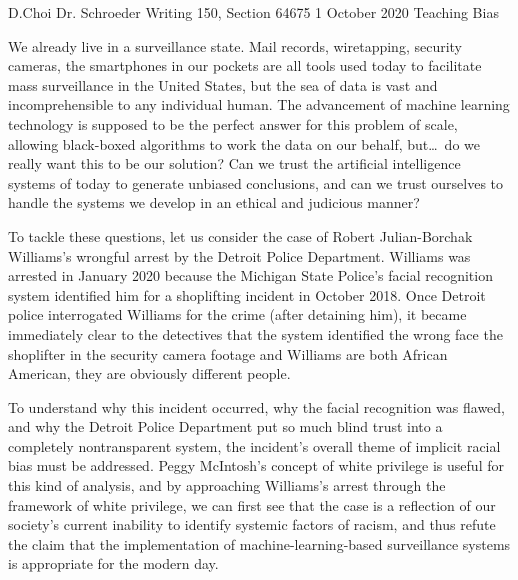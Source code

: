 \documentclass[12pt, letterpaper]{article}
\newcommand{\comment}[1]{}
\begin{document}
\begin{mla}
	{D.}{Choi}
	{Dr. Schroeder}
	{Writing 150, Section 64675}
	{1 October 2020}
	{Teaching Bias}


\comment{
The technology of the modern day is brilliant and terrifying. The tools
available to humanity now can have consequences on a previously unimaginable
scale\textemdash{we} can power the world with electricity, and in the process
destroy the ecosphere. We can inquire into the particle nature of the
universe, and use that knowledge to create mass-murder weapons. We can try to
teach artificial intelligence to detect and predict criminal activity, and
inadvertently establish an impenetrable surveillance state.
}

We already live in a surveillance state. Mail records, wiretapping, security
cameras, the smartphones in our pockets are all tools used
today to facilitate mass surveillance in the United States, but the sea of
data is vast and incomprehensible to any individual human. The advancement of
machine learning technology is supposed to be the perfect answer for this
problem of scale, allowing black-boxed algorithms to work the data on our
behalf, but\ldots\ do we really want this to be our solution? Can we trust
the artificial intelligence systems of today to generate unbiased conclusions,
and can we trust ourselves to handle the systems we develop in an ethical
and judicious manner?

To tackle these questions, let us consider the case of
Robert Julian-Borchak Williams's wrongful arrest by the Detroit Police
Department. Williams was arrested in January 2020 because the Michigan State
Police's facial recognition system identified him for a shoplifting incident
in October 2018. Once Detroit police interrogated Williams for the crime
(after detaining him), it became immediately clear to the detectives that the
system identified the wrong face the shoplifter in the
security camera footage and Williams are both African American, they are
obviously different people.

To understand why this incident occurred, why the facial recognition was
flawed, and why the Detroit Police Department put so much blind trust into a
completely nontransparent system, the incident's overall theme of implicit
racial bias must be addressed. Peggy McIntosh's concept of white privilege is
useful for this kind of analysis, and by approaching Williams's arrest through
the framework of white privilege, we can first see that the case is a
reflection of our society's current inability to identify systemic factors of
racism, and thus refute the claim that the implementation of
machine-learning-based surveillance systems is appropriate for the modern day.


\end{mla}
\end{document}
